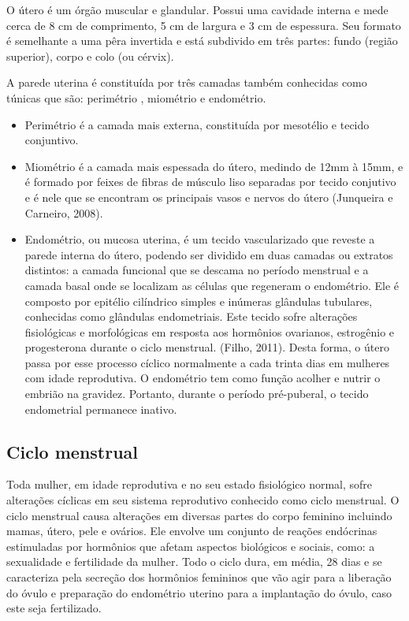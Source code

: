 \documentclass[12pt]{article} %
\begin{document}
O útero é um órgão muscular e glandular. Possui uma cavidade interna e
mede cerca de 8 cm de comprimento, 5 cm de largura e 3 cm de
espessura. Seu formato é semelhante a uma pêra invertida e está
subdivido em três partes: fundo (região superior), corpo e colo (ou cérvix). %

A parede uterina é constituída por três camadas também conhecidas como túnicas que são: perimétrio , miométrio e endométrio.

\begin{itemize}
\item Perimétrio é a camada mais externa,
constituída por mesotélio e tecido conjuntivo.

\item Miométrio é a camada mais espessada do útero, medindo de 12mm à 15mm,
  e é formado por feixes de fibras de músculo liso separadas por
  tecido conjutivo e é nele que se encontram os principais vasos e
  nervos do útero (Junqueira e Carneiro, 2008).

\item Endométrio, ou mucosa uterina, é um tecido vascularizado que
  reveste a parede interna do útero, podendo ser dividido em duas
  camadas ou extratos distintos: a camada funcional que se descama no
  período menstrual e a camada basal onde se localizam as células que
  regeneram o endométrio. Ele é composto por epitélio cilíndrico
  simples e inúmeras glândulas tubulares, conhecidas como glândulas
  endometriais. Este tecido sofre alterações fisiológicas e
  morfológicas em resposta aos hormônios ovarianos, estrogênio e
  progesterona durante o ciclo menstrual. (Filho, 2011).  Desta forma,
  o útero passa por esse processo cíclico normalmente a cada trinta
  dias em mulheres com idade reprodutiva.  O endométrio tem como
  função acolher e nutrir o embrião na gravidez. Portanto, durante o
  período pré-puberal, o tecido endometrial permanece inativo.
\end{itemize}


\subsection{Ciclo menstrual}


Toda mulher, em idade reprodutiva e no seu estado fisiológico normal, sofre alterações cíclicas em
seu sistema reprodutivo conhecido como ciclo menstrual. O ciclo
menstrual causa alterações em diversas partes do corpo feminino
incluindo mamas, útero, pele e ovários. Ele envolve um conjunto de
reações endócrinas estimuladas por hormônios que afetam aspectos biológicos e
sociais, como: a sexualidade e fertilidade da
mulher. Todo o ciclo dura, em média, 28 dias e se caracteriza pela
secreção dos hormônios femininos que vão agir para a liberação do
óvulo e preparação do endométrio uterino para a implantação do óvulo,
caso este seja fertilizado.
\end{document}
